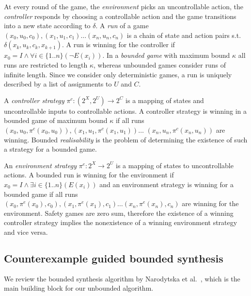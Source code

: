 \documentclass{llncs}
\begin{document}
At every round of the game, the \emph{environment} picks an uncontrollable
action, the \emph{controller} responds by choosing a controllable action and
the game transitions into a new state according to $\delta$.  A \emph{run} of a
game $(x_0, u_0, c_0), (x_1, u_1, c_1) \dots (x_n, u_n, c_n)$ is a chain of
state and action pairs s.t.\,$\delta(x_k, u_k, c_k, x_{k+1})$.  A run is
winning for the controller if $x_0 = I \land \forall i \in \{1..n\} (\lnot
E(x_i))$.  In a \emph{bounded game} with maximum bound $\kappa$ all runs are
restricted to length $\kappa$, whereas unbounded games consider runs of
infinite length.  Since we consider only deterministic games, a run is uniquely
described by a list of assignments to $U$ and $C$.

A \emph{controller strategy} $\pi^c : (2^X, 2^U) \to 2^C$ is a mapping of states and
uncontrollable inputs to controllable actions. A controller strategy is winning
in a bounded game of maximum bound $\kappa$ if all runs $(x_0, u_0, \pi^c(x_0,
u_0)), (x_1, u_1, \pi^c(x_1, u_1)) \dots$ $(x_n, u_n, \pi^c(x_n, u_n))$ are
winning.  Bounded \emph{realisability} is the problem of determining the
existence of such a strategy for a bounded game.

An \emph{environment strategy} $\pi^e : 2^X \to 2^U$ is a mapping of states to
uncontrollable actions. A bounded run is winning for the environment if $x_0 =
I \land \exists i \in \{1..n\} (E(x_i))$ and an environment strategy is winning
for a bounded game if all runs $(x_0, \pi^e(x_0), c_0), (x_1, \pi^e(x_1), c_1)
\dots (x_n, \pi^e(x_n), c_n)$ are winning for the environment.  Safety games
are zero sum, therefore the existence of a winning controller strategy implies
the nonexistence of a winning environment strategy and vice versa.

\subsection{Counterexample guided bounded synthesis}

We review the bounded synthesis algorithm by Narodytska et
al.~\cite{narodytska2014}, which is the main building block for our unbounded
algorithm.
\end{document}
